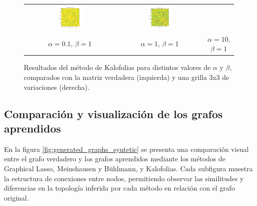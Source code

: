 \documentclass{article}
\begin{document}
\begin{figure}[htb]
\begin{minipage}[t]{0.72\textwidth}
\begin{tabular}{ccc}
            \includegraphics[width=0.28\textwidth]{imagenes/kalofolias/kalofolias_alpha1_beta1.pdf} &
            \includegraphics[width=0.28\textwidth]{imagenes/kalofolias/kalofolias_alpha10_beta1.pdf} \\
            $\alpha=0.1$, $\beta=1$ & $\alpha=1$, $\beta=1$ & $\alpha=10$, $\beta=1$ \\
        \end{tabular}
    \end{minipage}
    \caption{Resultados del método de Kalofolias para distintos valores de $\alpha$ y $\beta$, comparados con la matriz verdadera (izquierda) y una grilla 3x3 de variaciones (derecha).}
    \label{fig:kalofolias_grid}
\end{figure}

 

\subsection{Comparación y visualización de los grafos aprendidos}

En la figura \ref{fig:generated_graphs_syntetic} se presenta una comparación visual entre el grafo verdadero y los grafos aprendidos mediante los métodos de Graphical Lasso, Meinshausen y Bühlmann, y Kalofolias. Cada subfigura muestra la estructura de conexiones entre nodos, permitiendo observar las similitudes y diferencias en la topología inferida por cada método en relación con el grafo original.
\end{document}
